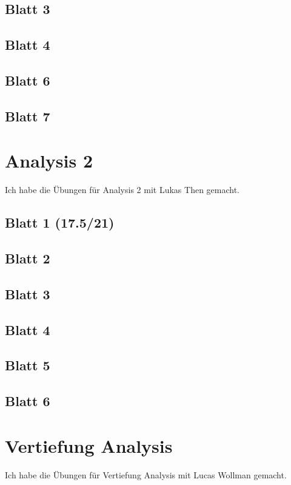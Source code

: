 \documentclass{tuftebook}
\numberwithin{Theorem}{chapter}
\theoremstyle{definition}
\theoremstyle{definition}
\begin{document}
\section{Blatt 3}

\section{Blatt 4}

\section{Blatt 6}

\section{Blatt 7}


\chapter{Analysis 2}
Ich habe die Übungen für Analysis 2 mit Lukas Then gemacht.
\section{Blatt 1 (17.5/21)}

\section{Blatt 2}

\section{Blatt 3}

\section{Blatt 4}

\section{Blatt 5}

\section{Blatt 6}


\chapter{Vertiefung Analysis}
Ich habe die Übungen für Vertiefung Analysis mit Lucas Wollman gemacht.
\end{document}
